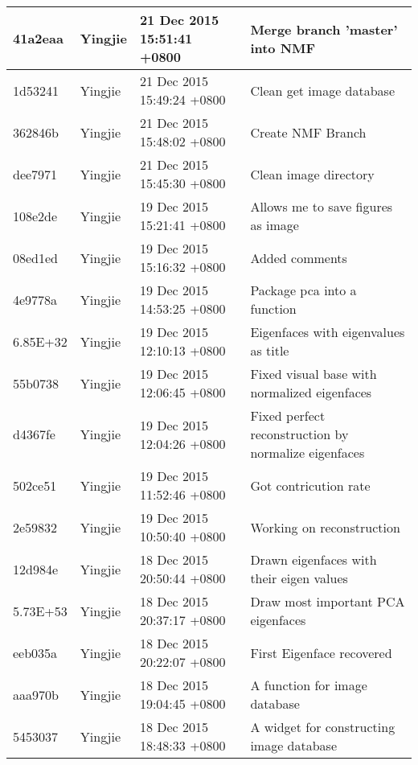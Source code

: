 \begin{longtable}{@{\extracolsep{\fill}}l|l|l|l@{}}
    41a2eaa  & Yingjie &  21 Dec 2015 15:51:41 +0800 & Merge branch 'master' into NMF                       \\ \hline
    1d53241  & Yingjie &  21 Dec 2015 15:49:24 +0800 & Clean get image database                             \\ \hline
    362846b  & Yingjie &  21 Dec 2015 15:48:02 +0800 & Create NMF Branch                                    \\ \hline
    dee7971  & Yingjie &  21 Dec 2015 15:45:30 +0800 & Clean image directory                                \\ \hline
    108e2de  & Yingjie &  19 Dec 2015 15:21:41 +0800 & Allows me to save figures as image                   \\ \hline
    08ed1ed  & Yingjie &  19 Dec 2015 15:16:32 +0800 & Added comments                                       \\ \hline
    4e9778a  & Yingjie &  19 Dec 2015 14:53:25 +0800 & Package pca into a function                          \\ \hline
    6.85E+32 & Yingjie &  19 Dec 2015 12:10:13 +0800 & Eigenfaces with eigenvalues as title                 \\ \hline
    55b0738  & Yingjie &  19 Dec 2015 12:06:45 +0800 & Fixed visual base with normalized eigenfaces         \\ \hline
    d4367fe  & Yingjie &  19 Dec 2015 12:04:26 +0800 & Fixed perfect reconstruction by normalize eigenfaces \\ \hline
    502ce51  & Yingjie &  19 Dec 2015 11:52:46 +0800 & Got contricution rate                                \\ \hline
    2e59832  & Yingjie &  19 Dec 2015 10:50:40 +0800 & Working on reconstruction                            \\ \hline
    12d984e  & Yingjie &  18 Dec 2015 20:50:44 +0800 & Drawn eigenfaces with their eigen values             \\ \hline
    5.73E+53 & Yingjie &  18 Dec 2015 20:37:17 +0800 & Draw most important PCA eigenfaces                   \\ \hline
    eeb035a  & Yingjie &  18 Dec 2015 20:22:07 +0800 & First Eigenface recovered                            \\ \hline
    aaa970b  & Yingjie &  18 Dec 2015 19:04:45 +0800 & A function for image database                        \\ \hline
    5453037  & Yingjie &  18 Dec 2015 18:48:33 +0800 & A widget for constructing image database             \\ \hline

\end{longtable}
